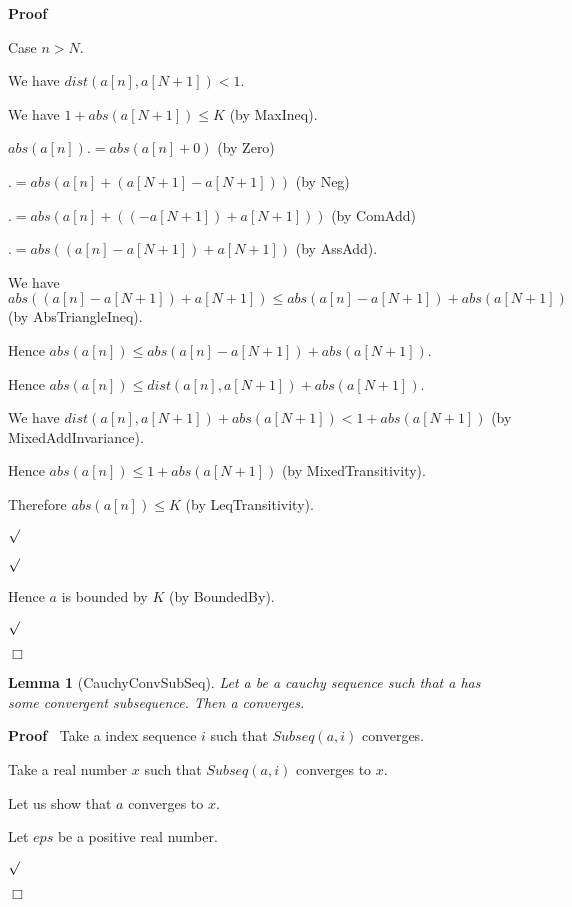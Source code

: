 \documentclass{article}
\newenvironment{forthel}{\begin{leftbar}}{\end{leftbar}}
\newenvironment{proof}{\noindent\textbf{Proof\ }}{\hspace*{\fill}$\Box$\medskip}
\newenvironment{subproof}{\begin{list}{}{}
		\item[\text{Proof}]}{\hfill $\surd$ \end{list}}
\newtheorem{lemma}{Lemma}
\begin{document}
\begin{forthel}
\begin{proof}
\begin{subproof}
\begin{subproof}
				Case $n > N$.
				
				\begin{subproof}
					We have $dist(a[n],a[N + 1]) < 1$.
					
					We have $1 + abs(a[N + 1]) \leq K$ (by MaxIneq).
					
					$abs(a[n]) .= abs(a[n] + 0)$ (by Zero)
					
					$.= abs(a[n] + (a[N + 1] - a[N + 1]))$ (by Neg)
					
					$.= abs(a[n] + ((-a[N + 1]) + a[N + 1]))$ (by ComAdd)
					
					$.= abs((a[n] - a[N + 1]) + a[N + 1])$ (by AssAdd).
					
					We have $abs((a[n] - a[N + 1]) + a[N + 1]) \leq abs(a[n] - a[N + 1]) + abs(a[N + 1])$ (by AbsTriangleIneq).
					
					Hence $abs(a[n]) \leq abs(a[n] - a[N + 1]) + abs(a[N + 1])$.
					
					Hence $abs(a[n]) \leq dist(a[n],a[N + 1]) + abs(a[N + 1])$.
					
					We have $dist(a[n],a[N + 1]) + abs(a[N + 1]) < 1 + abs(a[N + 1])$ (by MixedAddInvariance).
					
					Hence $abs(a[n]) \leq 1 + abs(a[N + 1])$ (by MixedTransitivity).
					
					Therefore $abs(a[n]) \leq K$ (by LeqTransitivity).
					
				\end{subproof}
									
			\end{subproof}
			
			Hence $a$ is bounded by $K$ (by BoundedBy).		
			
		\end{subproof}
	\end{proof}
	
	\begin{lemma}[CauchyConvSubSeq]
		Let a be a cauchy sequence such that a has some convergent subsequence. Then a converges.
	\end{lemma}
	
	\begin{proof}
		Take a index sequence $i$ such that $Subseq(a,i)$ converges.
		
		Take a real number $x$ such that $Subseq(a,i)$ converges to $x$.
		
		Let us show that $a$ converges to $x$.
		
		\begin{subproof}
			Let $eps$ be a positive real number.
			

\end{subproof}
\end{proof}
\end{forthel}
\end{document}
